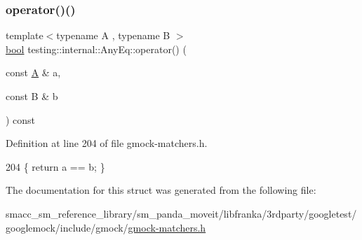 \subsubsection{\texorpdfstring{operator()()}{operator()()}}
{\footnotesize\ttfamily template$<$typename A , typename B $>$ \\
\hyperlink{classbool}{bool} testing\+::internal\+::\+Any\+Eq\+::operator() (\begin{DoxyParamCaption}\item[{const \hyperlink{namespacetesting_a5e9134d655d2fc9323902348083282e7}{A} \&}]{a,  }\item[{const B \&}]{b }\end{DoxyParamCaption}) const\hspace{0.3cm}{\ttfamily [inline]}}



Definition at line 204 of file gmock-\/matchers.\+h.


\begin{DoxyCode}
204 \{ \textcolor{keywordflow}{return} a == b; \}
\end{DoxyCode}


The documentation for this struct was generated from the following file\+:\begin{DoxyCompactItemize}
\item 
smacc\+\_\+sm\+\_\+reference\+\_\+library/sm\+\_\+panda\+\_\+moveit/libfranka/3rdparty/googletest/googlemock/include/gmock/\hyperlink{gmock-matchers_8h}{gmock-\/matchers.\+h}\end{DoxyCompactItemize}
